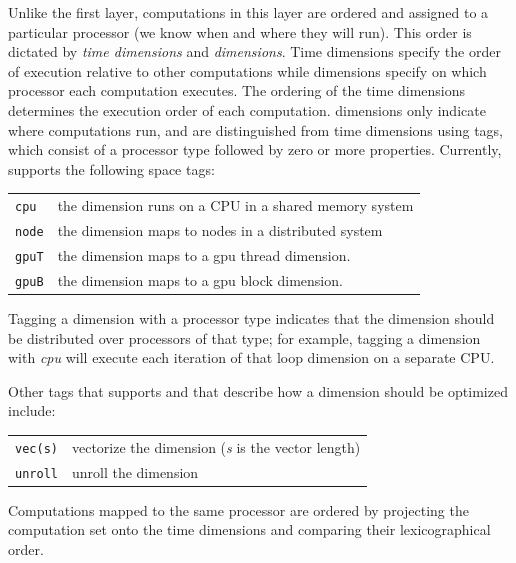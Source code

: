 Unlike the first layer, computations in this layer are ordered and assigned to a particular processor (we know when and where they will run).  This order is dictated by \textit{time dimensions} and \textit{\processor dimensions}.  Time dimensions specify the order of execution relative to other computations while \processor{} dimensions specify on which processor each computation executes.
The ordering of the time dimensions determines the execution order of each computation.
\Processor{} dimensions only indicate where computations run, and
are distinguished from time dimensions using tags, which consist of a processor type followed by
zero or more properties.  Currently, \framework{} supports the following space tags:

{
\centering
{
    \footnotesize
    \setlength\tabcolsep{5pt}
    \begin{tabular}{ll}
        \texttt{cpu} & the dimension runs on a CPU in a shared memory system \\
        \texttt{node} & the dimension maps to nodes in a distributed system \\
        \texttt{gpuT} & the dimension maps to a gpu thread dimension. \\
        \texttt{gpuB} & the dimension maps to a gpu block dimension.\\
    \end{tabular}
}
}

Tagging a dimension with a processor type indicates that the dimension should be distributed over processors of that type; for example, tagging a dimension with \emph{cpu} will execute each iteration of that loop dimension on a separate CPU.

Other tags that \framework{} supports and that describe how a dimension should be optimized include:

{
\centering
{
    \footnotesize
    \setlength\tabcolsep{5pt}
    \begin{tabular}{ll}
        \texttt{vec(s)} & vectorize the dimension (\emph{s} is the vector length)\\
        \texttt{unroll} & unroll the dimension\\
    \end{tabular}
}
}

Computations mapped to the same processor are ordered by projecting the computation set onto the time dimensions and comparing their lexicographical order.

